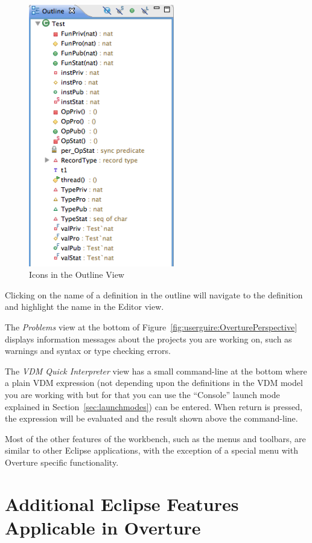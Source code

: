 \documentclass{overturerepchap}
\begin{document}
\begin{figure}[!htb]
\begin{center}
  \includegraphics[width=2.5in]{figures/OutlineIcons}
  \caption[labelInTOC]{Icons in the Outline View}
  \label{fig:OutlineIcons}
\end{center}
\end{figure}

Clicking on the name of a definition in the outline will navigate to
the definition and highlight the name in the Editor view.

The \emph{Problems} view at the bottom of
Figure~\ref{fig:userguire:OverturePerspective} displays
information messages about the projects you are
working on, such as warnings and syntax or type checking errors.

The \emph{VDM Quick Interpreter}
view has a small command-line at the bottom where a plain VDM expression
(not depending upon the definitions in the VDM model you are working
with but for that you can use the ``Console'' launch mode explained in
Section~\ref{sec:launchmodes}) can be
entered. When return is pressed, the expression will be evaluated and
the result shown above the command-line.

Most of the other features of the workbench, such as the menus and
toolbars, are similar to other Eclipse applications, with the exception
of a special menu with Overture specific functionality.

\section{Additional Eclipse Features Applicable in Overture}
\end{document}
